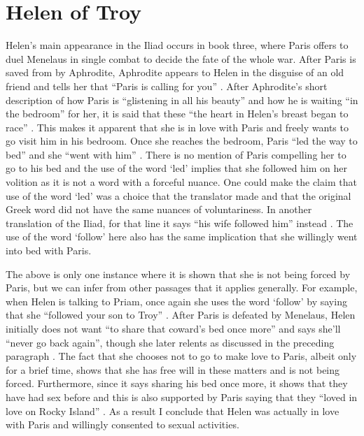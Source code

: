 \documentclass[11pt]{article}
\begin{document}
\section{Helen of Troy}
Helen's main appearance in the Iliad occurs in book three, where Paris offers to duel Menelaus in single combat to decide the fate of the whole war.
After Paris is saved from by Aphrodite, Aphrodite appears to Helen in the disguise of an old friend and tells her that ``Paris is calling for you'' \cite[book 3, line 450]{iliad}.
After Aphrodite's short description of how Paris is ``glistening in all his beauty'' and how he is waiting ``in the bedroom'' for her, it is said that these ``the heart in Helen's breast began to race'' \cite[book 3, line 456]{iliad}.
This makes it apparent that she is in love with Paris and freely wants to go visit him in his bedroom.
Once she reaches the bedroom, Paris ``led the way to bed'' and she ``went with him'' \cite[book 3, line 525]{iliad}.
There is no mention of Paris compelling her to go to his bed and the use of the word `led' implies that she followed him on her volition as it is not a word with a forceful nuance.
One could make the claim that use of the word `led' was a choice that the translator made and that the original Greek word did not have the same nuances of voluntariness.
In another translation of the Iliad, for that line it says ``his wife followed him'' instead \cite[book 3, line 448]{iliad-rieu}.
The use of the word `follow' here also has the same implication that she willingly went into bed with Paris.

The above is only one instance where it is shown that she is not being forced by Paris, but we can infer from other passages that it applies generally.
For example, when Helen is talking to Priam, once again she uses the word `follow' by saying that she ``followed your son to Troy'' \cite[book 3, line 210]{iliad}.
After Paris is defeated by Menelaus, Helen initially does not want ``to share that coward's bed once more'' and says she'll ``never go back  again'', though she later relents as discussed in the preceding paragraph \cite[book 3, line 475]{iliad}.
The fact that she chooses not to go to make love to Paris, albeit only for a brief time, shows that she has free will in these matters and is not being forced.
Furthermore, since it says sharing his bed once more, it shows that they have had sex before and this is also supported by Paris saying that they ``loved in love on Rocky Island'' \cite[book 3, line 522]{iliad}.
As a result I conclude that Helen was actually in love with Paris and willingly consented to sexual activities.
\end{document}
